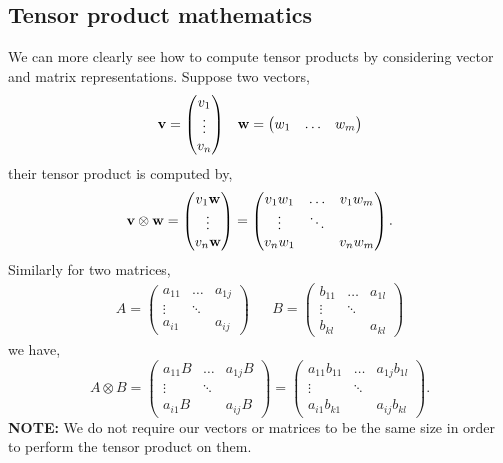 \documentclass{book}
\begin{document}
\subsection{Tensor product mathematics}
We can more clearly see how to compute tensor products by considering vector and matrix representations. Suppose two vectors,
\begin{align}
	\vb{v} = \begin{pmatrix}
		v_1 \\ \vdots \\ v_n
	\end{pmatrix} && \vb{w} = \begin{pmatrix}
	w_1 & \dots & w_m
	\end{pmatrix}
\end{align}
their tensor product is computed by,
\begin{equation}
	\vb{v}\otimes\vb{w} = \begin{pmatrix}
		v_1 \vb{w} \\ \vdots \\ v_n \vb{w}
	\end{pmatrix} = \begin{pmatrix}
	v_1 w_1 & \dots & v_1 w_m \\
	\vdots & \ddots & \\
	v_nw_1 & & v_nw_m
	\end{pmatrix}.
\end{equation}
Similarly for two matrices, 
\begin{align}
	A = \begin{pmatrix}
		a_{11} & \dots &  a_{1j} \\
		\vdots & \ddots & \\
		a_{i1} & & a_{ij}
	\end{pmatrix} && B = \begin{pmatrix}
		b_{11} & \dots &  a_{1l} \\
		\vdots & \ddots & \\
		b_{kl} & & a_{kl}
	\end{pmatrix}
\end{align}
we have,
\begin{equation}
	A \otimes B = \begin{pmatrix}
		a_{11} B & \dots & a_{1j}B \\
		\vdots & \ddots & \\
		a_{i1} B & & a_{ij} B
	\end{pmatrix} = \begin{pmatrix}
	a_{11}b_{11} & \dots & a_{1j}b_{1l} \\
	\vdots & \ddots & \\
	a_{i1}b_{k1} & & a_{ij}b_{kl}
	\end{pmatrix}.
\end{equation}
\textbf{NOTE:} We do not require our vectors or matrices to be the same size in order to perform the tensor product on them.
\end{document}
